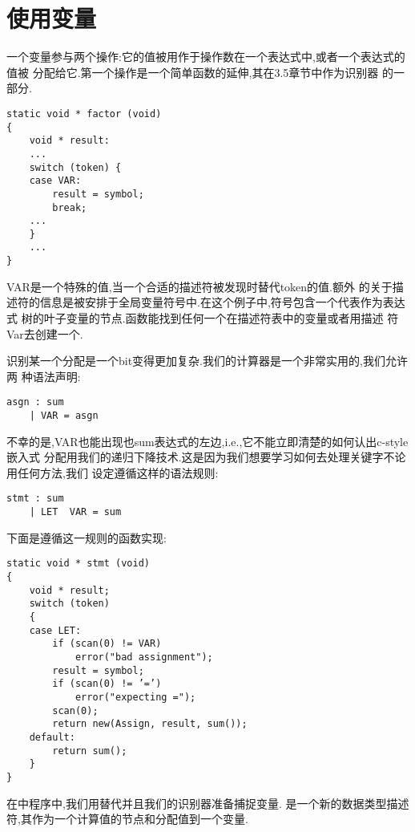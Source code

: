 \section{使用变量}
    一个变量参与两个操作:它的值被用作于操作数在一个表达式中,或者一个表达式的值被
分配给它.第一个操作是一个简单函数的延伸,其在3.5章节中作为识别器
的一部分.

\begin{lstlisting}
static void * factor (void)
{
    void * result:
    ...
    switch (token) {
    case VAR:
        result = symbol;
        break;
    ...
    }
    ...
}
\end{lstlisting}

    VAR是一个特殊的值,当一个合适的描述符被发现时替代token的值.额外
的关于描述符的信息是被安排于全局变量符号中.在这个例子中,符号包含一个代表作为表达式
树的叶子变量的节点.函数能找到任何一个在描述符表中的变量或者用描述
符Var去创建一个.

    识别某一个分配是一个bit变得更加复杂.我们的计算器是一个非常实用的,我们允许两
种语法声明:
\begin{lstlisting}
asgn : sum
    | VAR = asgn
\end{lstlisting}
不幸的是,VAR也能出现也sum表达式的左边,i.e.,它不能立即清楚的如何认出c-style嵌入式
分配用我们的递归下降技术.这是因为我们想要学习如何去处理关键字不论用任何方法,我们
设定遵循这样的语法规则:
\begin{lstlisting}
stmt : sum
    | LET  VAR = sum
\end{lstlisting}
下面是遵循这一规则的函数实现:
\begin{lstlisting}
static void * stmt (void) 
{ 
    void * result; 
    switch (token) 
    { 
    case LET: 
        if (scan(0) != VAR) 
            error("bad assignment"); 
        result = symbol; 
        if (scan(0) != ’=’) 
            error("expecting ="); 
        scan(0); 
        return new(Assign, result, sum()); 
    default: 
        return sum(); 
    } 
}
\end{lstlisting}

    在中程序中,我们用替代并且我们的识别器准备捕捉变量.
是一个新的数据类型描述符,其作为一个计算值的节点和分配值到一个变量.


